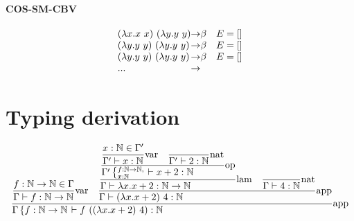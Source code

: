 \documentclass{article}
\newcommand{\st}[3][]{\ensuremath{\displaystyle\frac{#3\hfill}{#2\hfill} \text{#1}}}
\newcommand{\N}{\ensuremath \mathbb N}
\newcommand{\lam}[2]{\ensuremath{\lambda#1.#2}}
\begin{document}
\paragraph{COS-SM-CBV}
\begin{align*}
    \begin{array}{l@{\to}cl}
        (\lam{x}{x\ x})\ (\lam{y}{y\ y}) & \beta & E=[] \\
        (\lam{y}{y\ y})\ (\lam{y}{y\ y}) & \beta & E=[] \\
        (\lam{y}{y\ y})\ (\lam{y}{y\ y}) & \beta & E=[] \\
        ...
    \end{array}
\end{align*}

\section{Typing derivation}
\begin{equation*}
    \st[app]{
        \Gamma\left\{f:\N\to\N\right. \vdash f\ ((\lam{x}{x+2})\ 4): \N
    }{
        \st[var]{
            \Gamma \vdash f:\N\to\N
        }{
            f:\N\to\N \in \Gamma
        }
        \quad
        \st[app]{
            \Gamma\vdash (\lam{x}{x+2})\ 4: \N
        }{
            \st[lam]{
                \Gamma\vdash \lam{x}{x+2}:\N\to\N
            }{
                \st[op]{
                    \Gamma'\left\{\substack{f:\N\to\N\hfill,\\x:\N\hfill}\right.\vdash x+2:\N
                }{
                    \st[var]{
                        \Gamma'\vdash x:\N
                    }{
                        x:\N\in\Gamma'
                    }
                    \quad
                    \st[nat]{
                        \Gamma'\vdash 2:\N
                    }{
                    }
                }
            }
            \quad
            \st[nat]{
                \Gamma\vdash 4:\N
            }{}
        }
    }
\end{equation*}
\end{document}
